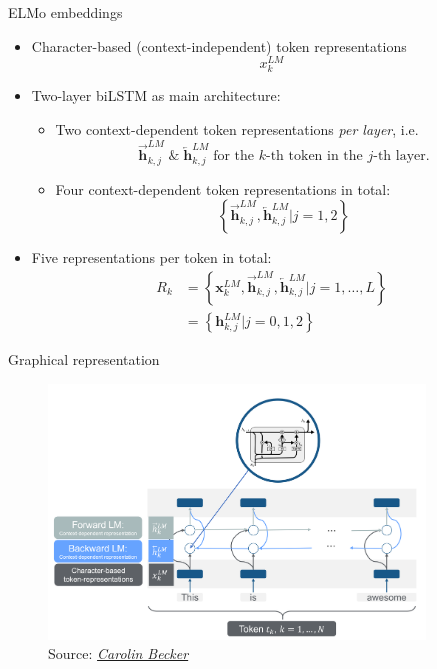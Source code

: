 
\begin{vbframe}{ELMo embeddings}

\vfill

	\begin{itemize}
		\item Character-based (context-independent) token representations $$x_k^{LM}$$
		\item Two-layer biLSTM as main architecture:
			\begin{itemize}
				\item Two context-dependent token representations \textit{per layer}, i.e.
							$$\overrightarrow{\mathbf{h}}_{k, j}^{L M}\; \mbox{\&}\; \overleftarrow{\mathbf{h}}_{k, j}^{L M}\; \mbox{for the $k$-th token in the $j$-th layer.}$$
				\item Four context-dependent token representations in total: 
							$$\left\{\overrightarrow{\mathbf{h}}_{k, j}^{L M}, \overleftarrow{\mathbf{h}}_{k, j}^{L M} | j = 1, 2\right\}$$
			\end{itemize}
		\item Five representations per token in total:
					$$\begin{aligned}
R_{k} &=\left\{\mathbf{x}_{k}^{L M}, \overrightarrow{\mathbf{h}}_{k, j}^{L M}, \overleftarrow{\mathbf{h}}_{k, j}^{L M} | j=1, \ldots, L\right\} \\
&=\left\{\mathbf{h}_{k, j}^{L M} | j = 0, 1, 2\right\}
\end{aligned}$$
	\end{itemize}

\vfill

\end{vbframe}


\begin{vbframe}{Graphical representation}

\vfill

	\begin{figure}
		\centering
		\includegraphics[width = 10cm]{figure/elmo-pretrained-bilm}\\ 
		\footnotesize{Source:} \href{https://slds-lmu.github.io/seminar_nlp_ss20/transfer-learning-for-nlp-i.html}{\footnotesize \it Carolin Becker}
	\end{figure}

\vfill

\end{vbframe}

